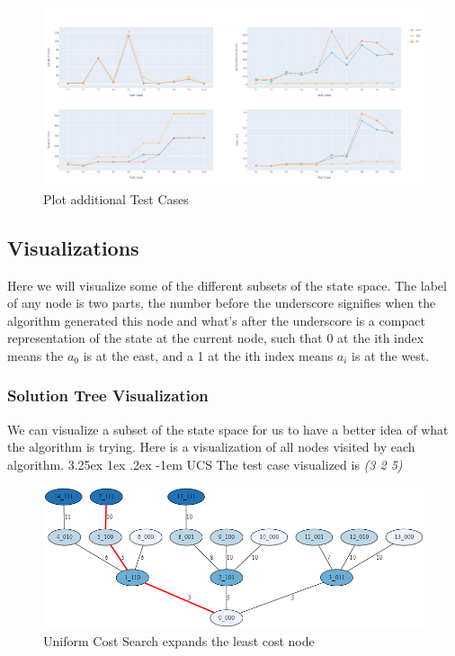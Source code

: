 \documentclass[12pt]{diazessay}
\makeatletter
\renewcommand\paragraph{\@startsection{paragraph}{5}{\z@}%
  {3.25ex \@plus1ex \@minus.2ex}%
  {-1em}%
  {\normalfont\normalsize\bfseries}}
\makeatother
\begin{document}
        \begin{figure}[h]
            \hskip-3.3cm
            \includegraphics[scale=0.3]{Figures/AlgoCompr.png}
            \caption{Plot additional Test Cases}
            \label{fig:cmp}
        \end{figure}

    \subsection{Visualizations}
        Here we will visualize some of the different subsets of the state space. 
        The label of any node is two parts, the number before the underscore signifies when the algorithm generated this node and what's after the underscore is a compact representation of the state at the current node, such that 0 at the ith index means the $a_0$ is at the east, and a 1 at the ith index means  $a_i$ is at the west.
        \subsubsection{Solution Tree Visualization}
            We can visualize a subset of the state space for us to have a better idea of what the algorithm is trying.
            Here is a visualization of all nodes visited by each algorithm.
                \paragraph{UCS} The test case visualized is  \textit{(3 2 5)}
                \hskip-4.0cm
                \begin{figure}[h]
                    \centering
                    \includegraphics[width=\textwidth]{Figures/UCS optimized.png}
                    \caption{Uniform Cost Search expands the least cost node}
                    \label{fig:UCS}
                \end{figure}
                
\end{document}

